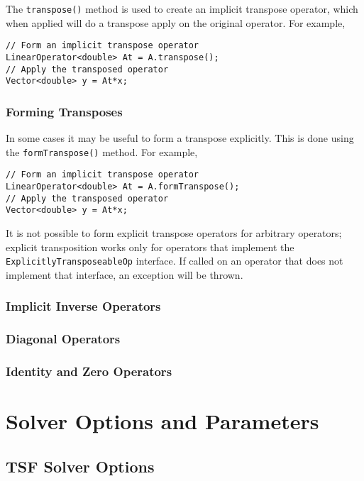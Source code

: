 \documentclass[12pt,relax]{SANDreport}
\begin{document}
The \verb+transpose()+ method is used to create an implicit transpose 
operator, which when applied will do a transpose apply on the original
operator. For example,
\begin{verbatim}
// Form an implicit transpose operator
LinearOperator<double> At = A.transpose();
// Apply the transposed operator
Vector<double> y = At*x;
\end{verbatim}

\subsection{Forming Transposes}

In some cases it may be useful to form a transpose explicitly. This is done
using the \verb+formTranspose()+ method. For example,
\begin{verbatim}
// Form an implicit transpose operator
LinearOperator<double> At = A.formTranspose();
// Apply the transposed operator
Vector<double> y = At*x;
\end{verbatim}
It is not possible to form explicit transpose operators for arbitrary
operators; explicit transposition works only for operators that implement
the \verb+ExplicitlyTransposeableOp+ interface. If called on an operator
that does not implement that interface, an exception will be thrown.



\subsection{Implicit Inverse Operators}

\subsection{Diagonal Operators}

\subsection{Identity and Zero Operators}





\chapter{Solver Options and Parameters\label{Section:OptionsAndParams}}

\section{TSF Solver Options\label{optionI}}
\end{document}
